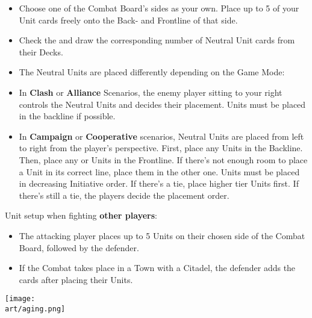 \begin{multicols}{2}
\begin{itemize}
  \item Choose one of the Combat Board's sides as your own.
    Place up to 5 of your Unit cards freely onto the Back- and Frontline of that side.
  \item Check the  and draw the corresponding number of Neutral Unit cards from their Decks.
  \item The Neutral Units are placed differently depending on the Game Mode:
  \item In \textbf{Clash} or \textbf{Alliance} Scenarios, the enemy player sitting to your right controls the Neutral Units and decides their placement.
     Units must be placed in the backline if possible.
  \item In \textbf{Campaign} or \textbf{Cooperative} scenarios, Neutral Units are placed from left to right from the player's perspective.
First, place any  Units in the Backline.
Then, place any  or  Units in the Frontline.
If there's not enough room to place a Unit in its correct line, place them in the other one.
Units must be placed in decreasing Initiative order.
If there's a tie, place higher tier Units first.
If there's still a tie, the players decide the placement order.
\end{itemize}
Unit setup when fighting \textbf{other players}:
\begin{itemize}[wide]
  \item The attacking player places up to 5 Units on their chosen side of the Combat Board, followed by the defender.
  \item If the Combat takes place in a Town with a Citadel, the defender adds the  cards after placing their Units.
\end{itemize}
\vfill
\begin{center}
  \texttt{[image: \\art/aging.png]}
\end{center}
\vfill
{}


\end{multicols}
